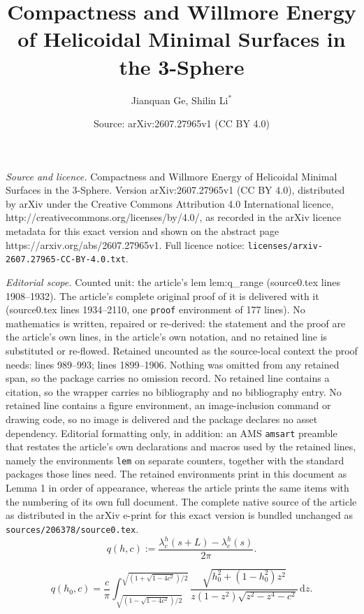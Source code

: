 \documentclass[10pt,a4paper]{amsart}
\title{Compactness and Willmore Energy of Helicoidal Minimal Surfaces in the 3-Sphere}
\author{Jianquan Ge, Shilin Li$^{*}$}
\date{Source: arXiv:2607.27965v1 (CC BY 4.0)}
\newcommand{\dif}{\mathrm{d}}
\begin{document}
\maketitle

\noindent\emph{Source and licence.} Compactness and Willmore Energy of Helicoidal Minimal Surfaces in the 3-Sphere. Version arXiv:2607.27965v1 (CC BY 4.0), distributed by arXiv under the Creative Commons Attribution 4.0 International licence, http://creativecommons.org/licenses/by/4.0/, as recorded in the arXiv licence metadata for this exact version and shown on the abstract page https://arxiv.org/abs/2607.27965v1. Full licence notice: \texttt{licenses/arxiv-2607.27965-CC-BY-4.0.txt}.\par\smallskip

\noindent\textit{Editorial scope.} Counted unit: the article's lem lem:q\_range (source0.tex lines 1908--1932). The article's complete original proof of it is delivered with it (source0.tex lines 1934--2110, one \texttt{proof} environment of 177 lines). No mathematics is written, repaired or re-derived: the statement and the proof are the article's own lines, in the article's own notation, and no retained line is substituted or re-flowed.  Retained uncounted as the source-local context the proof needs: lines 989--993; lines 1899--1906.  Nothing was omitted from any retained span, so the package carries no omission record.  No retained line contains a citation, so the wrapper carries no bibliography and no bibliography entry.  No retained line contains a figure environment, an image-inclusion command or drawing code, so no image is delivered and the package declares no asset dependency.  Editorial formatting only, in addition: an AMS \texttt{amsart} preamble that restates the article's own declarations and macros used by the retained lines, namely the environments \texttt{lem} on separate counters, together with the standard packages those lines need.  The retained environments print in this document as Lemma 1 in order of appearance, whereas the article prints the same items with the numbering of its own full document.  The complete native source of the article as distributed in the arXiv e-print for this exact version is bundled unchanged as \texttt{sources/206378/source0.tex}.
\begin{equation}\label{eq:q_definition}
q(h,c)
:=
\frac{\lambda_c^h(s+L)-\lambda_c^h(s)}{2\pi}.
\end{equation}

\begin{equation}\label{eq:q_explicit_integral}
q(h_0,c)
=
\frac{c}{\pi}
\int_{\sqrt{(1-\sqrt{1-4c^2})/2}}^{\sqrt{(1+\sqrt{1-4c^2})/2}}
\frac{\sqrt{h_0^2+(1-h_0^2)z^2}}
{z(1-z^2)\sqrt{z^2-z^4-c^2}}\,\dif z.
\end{equation}
\end{document}
